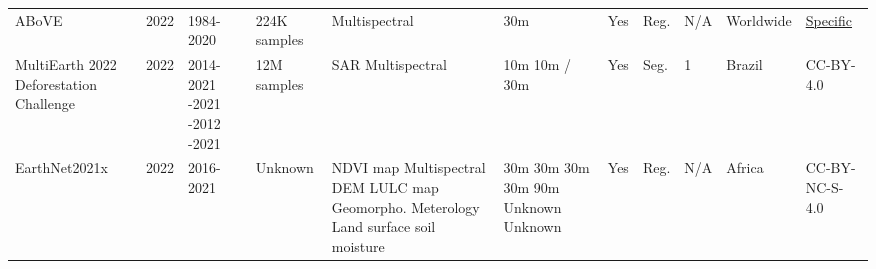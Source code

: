 \documentclass{CUP-JNL-DTM}%
\theoremstyle{definition}
\numberwithin{equation}{section}
\begin{document}
\begin{table*}[ht]
{\begin{fntable}
\begin{tabular}{p{1.5cm} | p{0.4cm} | p{1cm} | p{1.3cm} | p{1.2cm} : p{1cm} | p{0.4cm} | p{0.7cm} | p{0.8cm} | p{1cm} | p{1.1cm}}
ABoVE \cite{feng_m_arctic-boreal_2022} & 2022 & 1984-2020 & 224K samples & Multispectral & 30m & Yes & Reg. & N/A & Worldwide & \href{https://www.earthdata.nasa.gov/learn/use-data/data-use-policy?}{Specific} \\

MultiEarth 2022 Deforestation Challenge	\cite{lee_multiearth_2022} & 2022 & 2014-2021 -2021 -2012 -2021 & 12M samples & SAR \newline Multispectral & 10m \newline 10m / 30m & Yes & Seg. & 1 & Brazil & CC-BY-4.0 \\

EarthNet2021x \cite{robin_learning_2022} & 2022 & 2016-2021 & Unknown & NDVI map \newline Multispectral \newline DEM \newline LULC map \newline Geomorpho. \newline Meterology \newline Land surface soil moisture & 30m \newline 30m \newline 30m \newline 30m \newline 90m \newline Unknown \newline Unknown & Yes & Reg. & N/A & Africa	 & CC-BY-NC-S-4.0 \\

\bottomrule

\end{tabular}
\end{fntable}}
\label{tab:satellite2}
\end{table*}
\end{document}
